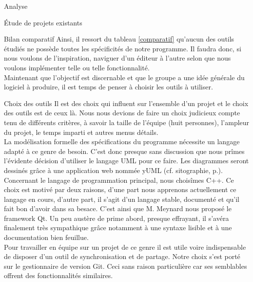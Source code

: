 \documentclass[a4paper, 12pt]{report}
\begin{document}
\begin{part}{Analyse}
\begin{chapter}{Étude de projets existants}
\begin{section}{Bilan comparatif}
				Ainsi, il ressort du tableau \ref{comparatif} qu'aucun des outils étudiés ne possède toutes les spécificités de notre programme.
				Il faudra donc, si nous voulons de l'inspiration, naviguer d'un éditeur à l'autre selon que nous voulons implémenter telle ou
				telle fonctionnalité.\\


				Maintenant que l'objectif est discernable et que le groupe a une idée générale du logiciel à produire, il est temps de
				penser à choisir les outils à utiliser.
			\end{section}
		\end{chapter}
		\begin{chapter}{Choix des outils}
			Il est des choix qui influent sur l'ensemble d'un projet et le choix des outils est de ceux là.
			Nous nous devions de faire un choix judicieux compte tenu de différents critères, à savoir la taille de l'équipe (huit personnes),
			l'ampleur du projet, le temps imparti et autres menus détails.\\


			La modélisation formelle des spécifications du programme nécessite un langage adapté à ce genre de besoin. C'est donc presque
			sans discussion que nous prîmes l'évidente décision d'utiliser le langage UML pour ce faire.
			Les diagrammes seront dessinés grâce à une application web nommée yUML (cf. sitographie, p.\pageref{sitographie}).\\


			Concernant le langage de programmation principal, nous choisîmes C++. Ce choix est motivé par deux raisons, d'une part nous apprenons
			actuellement ce langage en cours, d'autre part, il s'agit d'un langage stable, documenté et qu'il fait bon d'avoir dans sa besace.
			C'est ainsi que M. Meynard nous proposé le framework \gls{Qt}. Un peu austère de prime abord, presque effrayant, il s'avéra finalement très
			sympathique grâce notamment à une syntaxe lisible et à une documentation bien feuillue.\\


			Pour travailler en équipe sur un projet de ce genre il est utile voire indispensable de disposer d'un outil de synchronisation et
			de partage. Notre choix s'est porté sur le gestionnaire de version \gls{Git}. Ceci sans raison particulière car ses semblables offrent
			des fonctionnalités similaires.\\



\end{chapter}
\end{part}
\end{document}
